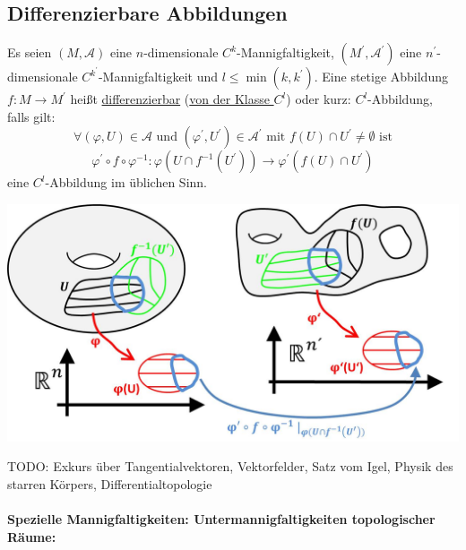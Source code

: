 \documentclass[a4paper,11pt,notitlepage]{report}
\theoremstyle{definition}
\newenvironment{definition}[1]{
	\begin{definitions}
	\marginnote{\emph{#1}}
}{\end{definitions}}
\begin{document}
\subsection{Differenzierbare Abbildungen}
\begin{definition}{$C^l$-Abbildung}
Es seien $(M, \mathcal{A})$ eine $n$-dimensionale $C^k$-Mannigfaltigkeit, $(M^\prime, \mathcal{A}^\prime)$ eine $n^\prime$-dimensionale $C^{k^\prime}$-Mannigfaltigkeit und $l \leq \min(k,k^\prime)$. Eine stetige Abbildung $f \colon M \rightarrow M^\prime$ heißt \underline{differenzierbar} (\underline{von der Klasse $C^l$}) oder kurz: $C^l$-Abbildung, falls gilt:
$$\forall (\varphi,U) \in \mathcal{A} \text{ und } (\varphi^\prime, U^\prime) \in \mathcal{A}^\prime \text{ mit } f(U) \cap U^\prime \neq \emptyset \text{ ist}$$
$$\boxed{\varphi^\prime \circ f \circ \varphi^{-1} \colon \varphi(U \cap f^{-1}(U^\prime)) \rightarrow \varphi^\prime(f(U)\cap U^\prime)}$$
eine $C^l$-Abbildung im üblichen Sinn.
\begin{center}
	\includegraphics[scale=0.4]{images/Abb_diffbar.jpg}
\end{center}
\end{definition}

TODO: Exkurs über Tangentialvektoren, Vektorfelder, Satz vom Igel, Physik des starren Körpers, Differentialtopologie

\newpage 
\paragraph{
Spezielle Mannigfaltigkeiten: Untermannigfaltigkeiten topologischer Räume: }
 
\end{document}
